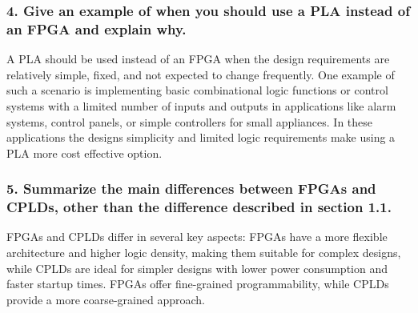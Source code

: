 \documentclass[11pt]{article}
\begin{document}
\subsubsection*{\textcolor{mycolor}{4. Give an example of when you should use a PLA instead of an FPGA and explain why.}}
A PLA should be used instead of an FPGA when the design requirements are relatively simple, fixed, and not expected to change frequently. One example of such a scenario is implementing basic combinational logic functions or control systems with a limited number of inputs and outputs in applications like alarm systems, control panels, or simple controllers for small appliances. In these applications the designs simplicity and limited logic requirements make using a PLA more cost effective option.
\subsubsection*{\textcolor{mycolor}{5. Summarize the main differences between FPGAs and CPLDs, other than the difference described in section 1.1.}}
FPGAs and CPLDs differ in several key aspects: FPGAs have a more flexible architecture and higher logic density, making them suitable for complex designs, while CPLDs are ideal for simpler designs with lower power consumption and faster startup times. FPGAs offer fine-grained programmability, while CPLDs provide a more coarse-grained approach.
\end{document}
